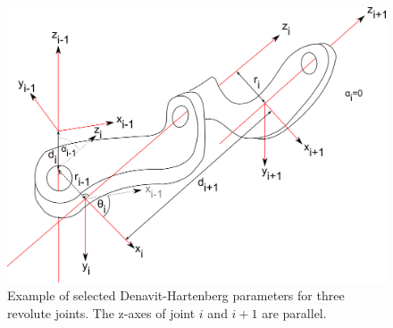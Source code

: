 \begin{figure}
	\centering
		\includegraphics[width=\textwidth]{figs/denavit-hartenberg}
	\caption{Example of selected Denavit-Hartenberg parameters for three revolute joints. The z-axes of joint $i$ and $i+1$ are parallel.
	\label{fig:denavit}}
\end{figure}



